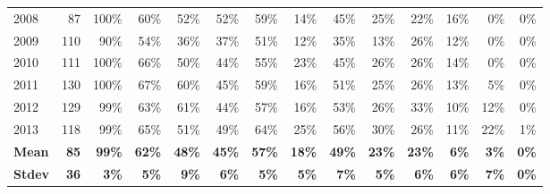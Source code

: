 \begin{table*}[t]
\begin{small}
\begin{tabular}{lrrrrrrrrrrrrr}
2008 & 87 & 100\% & 60\% & 52\% & 52\% & 59\% & 14\% & 45\% & 25\% & 22\% & 16\% & 0\% & 0\% \\ 
2009 & 110 & 90\% & 54\% & 36\% & 37\% & 51\% & 12\% & 35\% & 13\% & 26\% & 12\% & 0\% & 0\% \\ 
2010 & 111 & 100\% & 66\% & 50\% & 44\% & 55\% & 23\% & 45\% & 26\% & 26\% & 14\% & 0\% & 0\% \\ 
2011 & 130 & 100\% & 67\% & 60\% & 45\% & 59\% & 16\% & 51\% & 25\% & 26\% & 13\% & 5\% & 0\% \\ 
2012 & 129 & 99\% & 63\% & 61\% & 44\% & 57\% & 16\% & 53\% & 26\% & 33\% & 10\% & 12\% & 0\% \\ 
2013 & 118 & 99\% & 65\% & 51\% & 49\% & 64\% & 25\% & 56\% & 30\% & 26\% & 11\% & 22\% & 1\% \\ \hline
\textbf{Mean} & \textbf{85} & \textbf{99\%} & \textbf{62\%} & \textbf{48\%} & \textbf{45\%} & \textbf{57\%} & \textbf{18\%} & \textbf{49\%} & \textbf{23\%} & \textbf{23\%} & \textbf{6\%} & \textbf{3\%} & \textbf{0\%} \\
\textbf{Stdev} & \textbf{36} & \textbf{3\%} & \textbf{5\%} & \textbf{9\%} & \textbf{6\%} & \textbf{5\%} & \textbf{5\%} & \textbf{7\%} & \textbf{5\%} & \textbf{6\%} & \textbf{6\%} & \textbf{7\%} & \textbf{0\%} \\ 
\midrule
\end{tabular}
\end{small}
\label{Jensenius:tab:NIME}
\end{table*}



